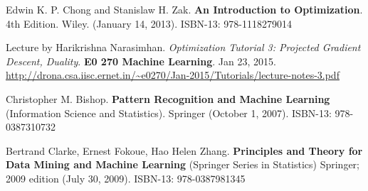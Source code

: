 \documentclass[10pt]{amsart}
\begin{document}
\begin{thebibliography}{9}
Edwin K. P. Chong and Stanislaw H. Zak.  \textbf{An Introduction to Optimization}.  4th Edition.  Wiley.  (January 14, 2013).  ISBN-13: 978-1118279014
  
Lecture by Harikrishna Narasimhan.  \emph{Optimization Tutorial 3: Projected Gradient Descent, Duality}.  \textbf{E0 270 Machine Learning}.  Jan 23, 2015.  \url{http://drona.csa.iisc.ernet.in/~e0270/Jan-2015/Tutorials/lecture-notes-3.pdf}

Christopher M. Bishop.  \textbf{Pattern Recognition and Machine Learning} (Information Science and Statistics).  Springer (October 1, 2007).  ISBN-13: 978-0387310732


Bertrand Clarke, Ernest Fokoue, Hao Helen Zhang.   \textbf{Principles and Theory for Data Mining and Machine Learning} (Springer Series in Statistics)  Springer; 2009 edition (July 30, 2009).  ISBN-13: 978-0387981345
 




\end{thebibliography}
\end{document}
